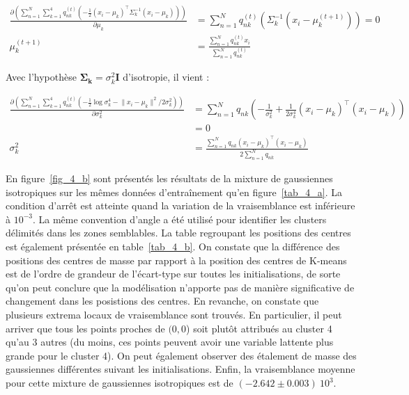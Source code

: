 \documentclass[12pt,a4paper,onecolumn]{article}
\begin{document}
\begin{equation}
	\begin{split}
		\frac{\partial\left(\sum_{n = 1}^N\sum_{k = 1}^4q_{nk}^{(t)}\left(
		-\frac{1}{2}\left(x_i - \mu_k\right)^{\intercal}\Sigma_k^{-1}\left(x_i - \mu_k\right)\right)\right)}{\partial\mu_k} &=
		\sum_{n = 1}^Nq_{nk}^{(t)}\left(\Sigma_k^{-1}(x_i-\mu_k^{(t+1)})\right) = 0\\
		\mu_k^{(t + 1)} &= \frac{\sum_{n = 1}^Nq_{nk}^{(t)}x_i}{\sum_{n = 1}^Nq_{nk}^{(t)}}
	\end{split}
\end{equation}

Avec l'hypothèse \(\bm{\Sigma_k} = \sigma_k^2\bm{I}\) d'isotropie, il vient :


\begin{equation}
	\begin{split}
		\frac{\partial\left(\sum_{n = 1}^N\sum_{k = 1}^4q_{nk}^{(t)}\left(
		-\frac{1}{2}\log\sigma_k^4-\lVert x_i - \mu_k\rVert^2 / 2\sigma_k^2\right)\right)}{\partial\sigma_k^2} &=
		\sum_{n = 1}^Nq_{nk}\left(-\frac{1}{\sigma_k^2} +\frac{1}{2\sigma_k^4}\left(x_i-\mu_k\right)^{\intercal}\left(x_i-\mu_k\right)\right)\\
		&= 0 \\
		\sigma_k^2 &= \frac{\sum_{n = 1}^Nq_{nk}\left(x_i-\mu_k\right)^{\intercal}\left(x_i-\mu_k\right)}{2\sum_{n = 1}^Nq_{nk}}
	\end{split}
\end{equation}

En figure~\ref{fig_4_b} sont présentés les résultats de la mixture de gaussiennes isotropiques sur les mêmes données d'entraînement qu'en figure~\ref{tab_4_a}. La condition d'arrêt est atteinte quand la variation de la vraisemblance est inférieure à \(10^{-3}\). La même convention d'angle a été utilisé pour identifier les clusters délimités dans les zones semblables. La table regroupant les positions des centres est également présentée en table~\ref{tab_4_b}. On constate que la différence des positions des centres de masse par rapport à la position des centres de K-means est de l'ordre de grandeur de l'écart-type sur toutes les initialisations, de sorte qu'on peut conclure que la modélisation n'apporte pas de manière significative de changement dans les posistions des centres. En revanche, on constate que plusieurs extrema locaux de vraisemblance sont trouvés. En particulier, il peut arriver que tous les points proches de \((0,0\)) soit plutôt attribués au cluster 4 qu'au 3 autres (du moins, ces points peuvent avoir une variable lattente plus grande pour le cluster 4). On peut également observer des étalement de masse des gaussiennes différentes suivant les initialisations. Enfin, la vraisemblance moyenne pour cette mixture de gaussiennes isotropiques est de \((-2.642\pm0.003)~10^3\).
\end{document}
